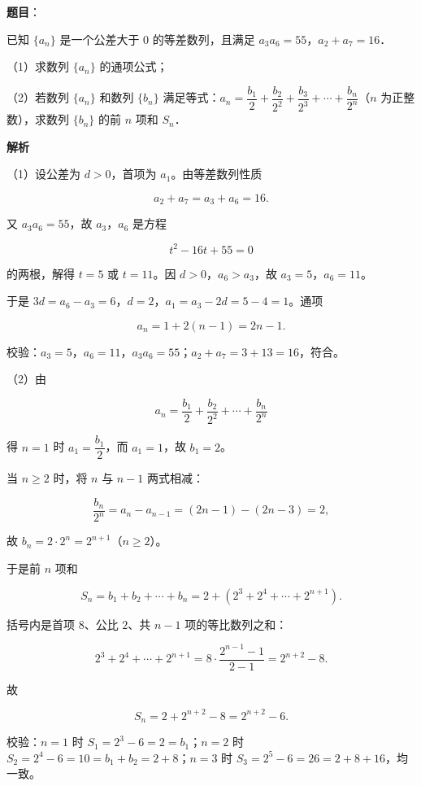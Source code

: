 \begin{answer}

\textbf{题目}：

已知 $\{a_n\}$ 是一个公差大于 $0$ 的等差数列，且满足 $a_3a_6=55$，$a_2+a_7=16$．

（1）求数列 $\{a_n\}$ 的通项公式；

（2）若数列 $\{a_n\}$ 和数列 $\{b_n\}$ 满足等式：$a_n=\dfrac{b_1}{2}+\dfrac{b_2}{2^2}+\dfrac{b_3}{2^3}+\cdots+\dfrac{b_n}{2^n}$（$n$ 为正整数），求数列 $\{b_n\}$ 的前 $n$ 项和 $S_n$．

\textbf{解析}

（1）设公差为 $d>0$，首项为 $a_1$。由等差数列性质

\nopagebreak[4]
\[a_2+a_7=a_3+a_6=16.\]

又 $a_3a_6=55$，故 $a_3$，$a_6$ 是方程

\nopagebreak[4]
\[t^2-16t+55=0\]

的两根，解得 $t=5$ 或 $t=11$。因 $d>0$，$a_6>a_3$，故 $a_3=5$，$a_6=11$。

于是 $3d=a_6-a_3=6$，$d=2$，$a_1=a_3-2d=5-4=1$。通项

\nopagebreak[4]
\[a_n=1+2(n-1)=2n-1.\]

校验：$a_3=5$，$a_6=11$，$a_3a_6=55$；$a_2+a_7=3+13=16$，符合。

（2）由

\nopagebreak[4]
\[a_n=\frac{b_1}{2}+\frac{b_2}{2^2}+\cdots+\frac{b_n}{2^n}\]

得 $n=1$ 时 $a_1=\dfrac{b_1}{2}$，而 $a_1=1$，故 $b_1=2$。

当 $n\geqslant2$ 时，将 $n$ 与 $n-1$ 两式相减：

\nopagebreak[4]
\[\frac{b_n}{2^n}=a_n-a_{n-1}=(2n-1)-(2n-3)=2,\]

故 $b_n=2\cdot2^n=2^{n+1}$（$n\geqslant2$）。

于是前 $n$ 项和

\nopagebreak[4]
\[S_n=b_1+b_2+\cdots+b_n=2+\left(2^3+2^4+\cdots+2^{n+1}\right).\]

括号内是首项 $8$、公比 $2$、共 $n-1$ 项的等比数列之和：

\nopagebreak[4]
\[2^3+2^4+\cdots+2^{n+1}=8\cdot\frac{2^{n-1}-1}{2-1}=2^{n+2}-8.\]

故

\nopagebreak[4]
\[S_n=2+2^{n+2}-8=2^{n+2}-6.\]

校验：$n=1$ 时 $S_1=2^3-6=2=b_1$；$n=2$ 时 $S_2=2^4-6=10=b_1+b_2=2+8$；$n=3$ 时 $S_3=2^5-6=26=2+8+16$，均一致。


\end{answer}
